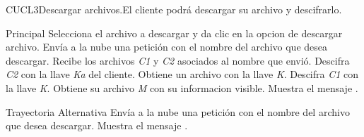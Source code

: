 
\begin{UseCase}{CUCL3}{Descargar archivos.}{El cliente podrá descargar su archivo y descifrarlo.}

\end{UseCase}


\begin{UCtrayectoria}{Principal}
\UCpaso [\UCactor] Selecciona el archivo a descargar y da clic en la opcion de descargar archivo.
\UCpaso [\UCactor] Envía a la nube una petición con el nombre del archivo que desea descargar.
\UCpaso Recibe los archivos \textit{C1} y \textit{C2} asociados al nombre que envió.
\UCpaso Descifra \textit{C2} con la llave \textit{Ka} del cliente.
\UCpaso Obtiene un archivo con la llave \textit{K}.
\UCpaso Descifra \textit{C1} con la llave \textit{K}.
\UCpaso Obtiene su archivo \textit{M} con su informacion visible.
\UCpaso Muestra el mensaje .
\end{UCtrayectoria}

\begin{UCtrayectoria}{Trayectoria Alternativa}
\UCpaso [\UCactor] Envía a la nube una petición con el nombre del archivo que desea descargar.
\UCpaso Muestra el mensaje .\end{UCtrayectoria}


